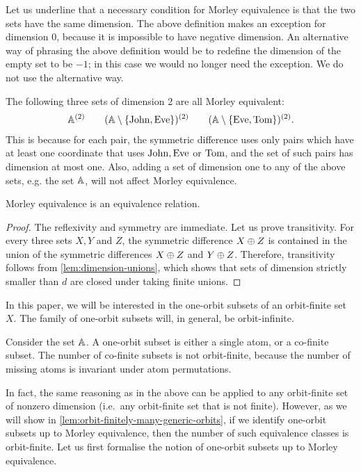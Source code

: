 Let us underline that a necessary condition for Morley equivalence is that the two sets have the same dimension.
The above definition makes an exception for dimension $0$, because it is impossible to have negative dimension. An alternative way of phrasing the above definition would be to redefine the dimension of the empty set to be $-1$; in this case we would no longer need the exception. We do not use the alternative way.

\begin{myexample}
The following three sets of dimension 2 are all Morley equivalent:
\begin{align*}
	\mathbb A^{(2)}
	\qquad
	(\mathbb A \setminus \{\mathrm{John}, \mathrm{Eve}\})^{(2)}
	\qquad
	(\mathbb A \setminus \{\mathrm{Eve}, \mathrm{Tom}\})^{(2)}.
\end{align*}
This is because for each pair, the symmetric difference uses only pairs which have at least one coordinate that uses $\mathrm{John}, \mathrm{Eve}$ or $\mathrm{Tom}$, and the set of such pairs has dimension at most one. Also, adding a set of dimension one to any of the above sets, e.g. the set $\mathbb A$, will not affect Morley equivalence.
\end{myexample}



\begin{lemma}
	Morley equivalence is an equivalence relation.
\end{lemma}
\begin{proof}
	The reflexivity and symmetry are immediate. Let us prove transitivity. For every three sets $X, Y$ and $Z$, the  symmetric difference $X \oplus Z$ is contained in the union of the symmetric differences $X \oplus Z$ and $Y \oplus Z$. Therefore, transitivity follows from \cref{lem:dimension-unions}, which shows that sets of dimension strictly smaller than $d$ are closed under taking finite unions.
\end{proof}


In this paper, we will be interested in the one-orbit subsets of an orbit-finite set $X$. The family of one-orbit subsets will, in general, be orbit-infinite. 

\begin{myexample}
    Consider the set $\mathbb A$. A one-orbit subset is either a single atom, or a co-finite subset. The number of  co-finite subsets is not orbit-finite, because the number of missing atoms is invariant under atom permutations.
\end{myexample}  

In fact, the same reasoning as in the above can be applied to any orbit-finite set of nonzero dimension (i.e.~any orbit-finite set that is not finite). However, as we will show in \cref{lem:orbit-finitely-many-generic-orbits}, if we identify one-orbit subsets up to Morley equivalence, then the number of such equivalence classes is orbit-finite. Let us first formalise the notion of one-orbit subsets up to Morley equivalence.

